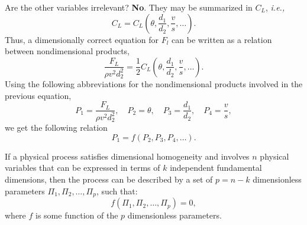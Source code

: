 \documentclass[xcolor=svgnames, t]{beamer}
\theoremstyle{definition}
\theoremstyle{plain}
\theoremstyle{remark}
\begin{document}
\begin{frame}[allowframebreaks]
Are the other variables irrelevant? \textbf{No}. They may be summarized in $ C_L $, \textit{i.e.,} $$ C_L =C_L(\theta, \frac{d_1}{d_2}, \frac{v}{s},\dots ). $$  
Thus, a dimensionally correct equation for $ F_l $ can be written as a relation between nondimensional products,
$$  \frac{F_L}{\rho v^2 d_2^2} =  \frac{1}{2}C_L(\theta, \frac{d_1}{d_2}, \frac{v}{s},\dots ).   $$ 
Using the following abbreviations for the nondimensional products involved in the previous equation,
$$ P_1 = \frac{F_L}{\rho v^2 d_2^2},\quad P_2=\theta,\quad P_3= \frac{d_1}{d_2},\quad P_4= \frac{v}{s}, $$ 
we get the following relation
$$ P_1 = f(P_2,P_3,P_4,\dots). $$ 
\begin{tcolorbox}[colback=lightgray!5!white,colframe=black,title=Buckingham Theorem]
If a physical process satisfies dimensional homogeneity and involves $n$ physical variables that can be expressed in terms of $k$ independent fundamental dimensions, then the process can be described by a set of $p = n - k$ dimensionless parameters $\Pi_1, \Pi_2, \ldots, \Pi_p$, such that:
$$f(\Pi_1, \Pi_2, \ldots, \Pi_p) = 0,$$
where $f$ is some function of the $p$ dimensionless parameters.
\end{tcolorbox}
\end{frame}
\end{document}
